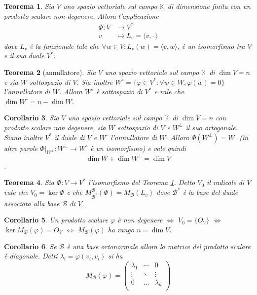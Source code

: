 \documentclass[9pt, a4paper]{article}
\newcommand{\K}{\mathbb{K}}
\newcommand{\letvs}{Sia $ V $ uno spazio vettoriale sul campo $ \K $}
\newcommand{\scprd}[2]{\langle #1, #2 \rangle}
\theoremstyle{mythm}
\newtheorem{thm}{Teorema}[section]
\newtheorem{corollary}[thm]{Corollario}
\begin{document}
\begin{thm} \label{thm:isom_duale}
	\letvs \ di dimensione finita con un prodotto scalare non degenere. Allora l'applicazione
	\begin{align*}
	\Phi \colon V & \to V^{*} \\
	v & \mapsto L_v = \scprd{v}{\cdot \,}
	\end{align*}
	dove $ L_v $ è la funzionale tale che $ \forall w \in V : L_v(w) = \scprd{v}{w} $, è un isomorfismo tra $ V $ e il suo duale $ V^{*} $. 
\end{thm}

\begin{thm}[annullatore]
	\letvs \ di $ \dim V = n $ e sia $ W $ sottospazio di $ V $. Sia inoltre $ W^{\circ} = \{\varphi \in V^{*} : \forall w \in W, \varphi(w) = 0\} $ l'annullatore di $ W $. Allora $ W^{\circ} $ è sottospazio di $ V^{*} $ e vale che $ \dim W^{\circ} = n - \dim W $. 
\end{thm}

\begin{corollary}
	\letvs \ di $ \dim V = n $ con prodotto scalare non degenere, sia $ W $ sottospazio di $ V $ e $ W^{\perp} $ il suo ortogonale. Siano inoltre $ V^{*} $ il duale di $ V $ e $ W^{\circ} $ l'annullatore di $ W $. Allora $ \Phi(W^{\perp}) = W^{\circ} $ (in altre parole $ \Phi|_{W^{\perp}} \colon W^{\perp} \to W^{\circ} $ è un isomorfismo) e vale quindi \[\dim W + \dim W^{\perp} = \dim V\]. 
\end{corollary}

\begin{thm}
	Sia $ \Phi \colon V \to V^{*} $ l'isomorfismo del Teorema \ref{thm:isom_duale}. Detto $ V_0 $ il radicale di $ V $ vale che $ V_0 = \ker \Phi $ e che $ M_{\mathscr{B^{*}}}^{\mathscr{B}} (\Phi) = M_{\mathscr{B}}(L_v) $ dove $ \mathscr{B}^{*} $ è la base del duale associata alla base $ \mathscr{B} $ di $ V $. 
\end{thm}

\begin{corollary}
	Un prodotto scalare $ \varphi $ è non degenere $ \iff $ $ V_0 = \{O_V\} $ $ \iff $ $ \ker M_{\mathscr{B}}(\varphi) = O_V $ $ \iff $ $ M_{\mathscr{B}}(\varphi) $ ha rango $ n = \dim V $. 
\end{corollary}

\begin{corollary}
	Se $ \mathscr{B} $ è una base ortonormale allora la matrice del prodotto scalare è diagonale. Detti $ \lambda_i = \varphi(v_i, v_i) $ si ha 
	\[M_{\mathscr{B}}(\varphi) = 
	\begin{pmatrix}
	\lambda_1 & \cdots & 0 \\
	\vdots & \ddots & \vdots \\
	0 & \ldots & \lambda_n \\
	\end{pmatrix}\]
\end{corollary}
\end{document}
